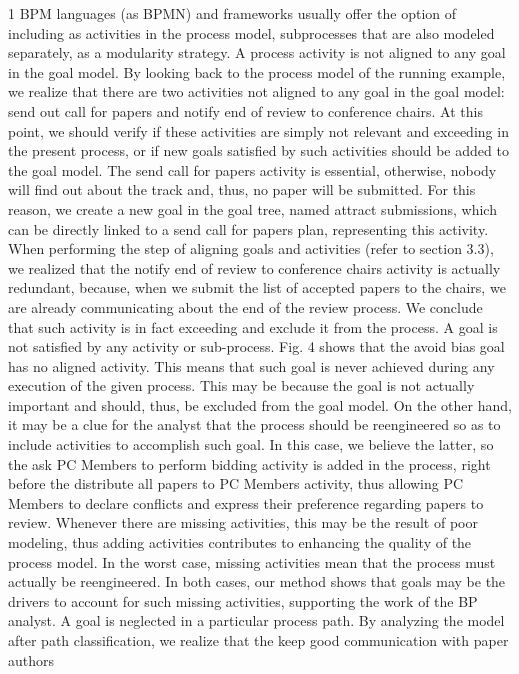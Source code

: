 1 BPM languages (as BPMN) and frameworks usually offer the option of including as activities
in the process model, subprocesses that are also modeled separately, as a modularity strategy.
A process activity is not aligned to any goal in the goal model. By looking back
to the process model of the running example, we realize that there are two activities not
aligned to any goal in the goal model: send out call for papers and notify end of
review to conference chairs. At this point, we should verify if these activities are
simply not relevant and exceeding in the present process, or if new goals satisfied by
such activities should be added to the goal model.
The send call for papers activity is essential, otherwise, nobody will find out about
the track and, thus, no paper will be submitted. For this reason, we create a new goal in
the goal tree, named attract submissions, which can be directly linked to a send call
for papers plan, representing this activity.
When performing the step of aligning goals and activities (refer to section 3.3), we
realized that the notify end of review to conference chairs activity is actually redundant, because, when we submit the list of accepted papers to the chairs, we are already
communicating about the end of the review process. We conclude that such activity is
in fact exceeding and exclude it from the process.
A goal is not satisfied by any activity or sub-process. Fig. 4 shows that the avoid
bias goal has no aligned activity. This means that such goal is never achieved during
any execution of the given process. This may be because the goal is not actually important and should, thus, be excluded from the goal model. On the other hand, it may
be a clue for the analyst that the process should be reengineered so as to include activities to accomplish such goal. In this case, we believe the latter, so the ask PC Members to perform bidding activity is added in the process, right before the distribute
all papers to PC Members activity, thus allowing PC Members to declare conflicts
and express their preference regarding papers to review.
Whenever there are missing activities, this may be the result of poor modeling, thus
adding activities contributes to enhancing the quality of the process model. In the worst
case, missing activities mean that the process must actually be reengineered. In both
cases, our method shows that goals may be the drivers to account for such missing
activities, supporting the work of the BP analyst.
A goal is neglected in a particular process path. By analyzing the model after path
classification, we realize that the keep good communication with paper authors
